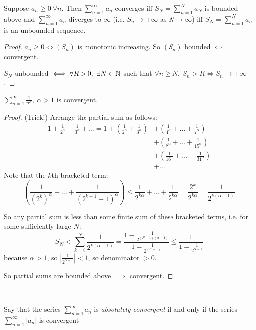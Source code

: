 \begin{proposition}
Suppose $a_n \geq 0 ~\forall n$. Then $\sum_{n=1}^{\infty} a_n$ converges iff $S_N = \sum_{n=1}^{N}a_N$ is bounded above and $\sum_{n=1}^{\infty} a_n$ diverges to $\infty$ (i.e. $S_n \to +\infty$ as $N \to \infty$) iff $S_N = \sum_{n=1}^{N} a_n$ is an unbounded sequence. 
\end{proposition}

\begin{proof}
$a_n \geq 0 \iff (S_n)$ is monotonic increasing. So $(S_n)$ bounded $\iff$ convergent.

$S_N$ unbounded $\iff \forall R>0,~ \exists N \in \mathbb{N}$ such that $\forall n \geq N,~ S_n > R \iff S_n \to +\infty$. 
\end{proof}\vspace*{10pt}

\begin{example}
$\sum_{n=1}^{\infty} \frac{1}{n^{\alpha}},~ \alpha > 1$ is convergent.
\begin{proof}
(Trick!) Arrange the partial sum as follows:
\[\begin{aligned}
1 + \frac{1}{2^\alpha} + \frac{1}{3^\alpha} + \dots  = 1 + \left(\frac{1}{2^\alpha} + \frac{1}{3^\alpha}\right) &+ \left(\frac{1}{4^\alpha} + \dots +\frac{1}{7^\alpha}\right)  \\ 
&+ \left(\frac{1}{8^\alpha} + \dots + \frac{1}{15^\alpha}\right) \\
&+ \left(\frac{1}{16^\alpha} + \dots + \frac{1}{31^\alpha}\right) \\
&+ \dots  \end{aligned}\]
Note that the $k$th bracketed term:
\[\left(\frac{1}{(2^k)^\alpha} + \dots +\frac{1}{(2^{k+1}-1)^\alpha}\right ) \leq \frac{1}{2^{k\alpha}} + \dots + \frac{1}{2^{k\alpha}} = \frac{2^k}{2^{k\alpha}} = \frac{1}{2^{k(\alpha-1)}}\]

So any partial sum is less than some finite sum of these bracketed terms, i.e. for some sufficiently large $N$: \[ S_N < \sum_{k=0}^{N} \frac{1}{2^{k(\alpha -1)}} = \frac{1-\frac{1}{2^{(N+1)(\alpha -1)}}}{1-\frac{1}{2^{(\alpha-1)}}} \leq \frac{1}{1-\frac{1}{2^{\alpha-1}}}\] because $\alpha >1$, so $\left|\frac{1}{2^{\alpha-1}}\right| < 1$, so denominator $>0$. 

So partial sums are bounded above $\implies$ convergent. 
\end{proof}	
\end{example}~

\begin{definition}
Say that the series $\sum_{n=1}^{\infty}a_n$ is \emph{absolutely convergent} if and only if the series $\sum_{n=1}^{\infty} |a_n|$ is convergent	
\end{definition}~

